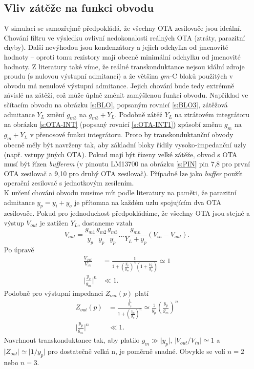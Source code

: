 \subsection{Vliv zátěže na funkci obvodu}
\noindent V simulaci se samozřejmě předpokládá, že všechny OTA zesilovače jsou ideální. Chování filtru ve výsledku ovlivní nedokonalosti reálných OTA (ztráty, parazitní chyby). Další nevýhodou jsou kondenzátory a jejich odchylka od jmenovité hodnoty -- oproti tomu rezistory mají obecně minimální odchylku od jmenovité hodnoty. Z literatury \cite{18} také víme, že reálné transkonduktance nejsou idální zdroje proudu (s nulovou výstupní admitancí) a že většina $gm$-C bloků použitých v obvodu má nenulové výstupní admitance. Jejich chování bude tedy extrémně závislé na zátěži, což může úplně změnit zamýšlenou funkci obvodu. Například ve sčítacím obvodu na obrázku \ref{s:BLO}, popsaným rovnicí \ref{s:BLO3}, zátěžová admitance $Y_L$ změní $g_{m3}$ na $g_{m3} + Y_L$. Podobně zátěž $Y_L$ na ztrátovém integrátoru na obrázku \ref{s:OTA-INT} (popsaný rovnicí \ref{s:OTA-INT1}) způsobí změnu $g_m$ na $g_m + Y_L$ v přenosové funkci integrátoru. Proto by transkonduktanční obvody obecně měly být navrženy tak, aby základní bloky řídily vysoko-impedanční uzly (např. vstupy jiných OTA). Pokud mají být řízeny velké zátěže, obvod s OTA musí být řízen \textit{bufferem} (v pinoutu LM13700 na obrázku \ref{s:PIN} pin 7,8 pro první OTA zesilovač a 9,10 pro druhý OTA zesilovač). Případně lze jako \textit{buffer} použít operační zesilovač s jednotkovým zesílením.\\
\noindent K určení chování obvodu musíme mít podle literatury \cite{18} na paměti, že parazitní admitance $y_p = y_i + y_o$ je přítomna na každém uzlu spojujícím dva OTA zesilovače. Pokud pro jednoduchost předpokládáme, že všechny OTA jsou stejné a výstup $V_{out}$ je zatížen $Y_L$, dostaneme vztah
\begin{equation}
V_{out} = \frac{g_{m1}}{y_p}\frac{g_{m2}}{y_p}\frac{g_{m3}}{y_p} \ldots \frac{g_{mn}}{Y_L + y_p}(V_{in} - V_{out}).
\end{equation}
\noindent Po úpravě
\begin{align}
\frac{V_{out}}{V_{in}} &= \frac{1}{1 + (\frac{y_p}{g_m})^n(1 + \frac{Y_L}{y_p})} \simeq 1 \\
\lvert \frac{y_p}{g_m} \rvert ^n &\ll 1.
\end{align}
\noindent Podobně pro výstupní impedanci $Z_{out}(p)$ platí
\begin{align}
Z_{out}(p) &= \frac{\frac{1}{y_p}}{1 + (\frac{g_m}{y_p})^n} \simeq \frac{1}{y_p}(\frac{y_p}{g_m})^n \\
\lvert \frac{y_p}{g_m} \rvert ^n &\ll 1.
\end{align}
\noindent Navrhnout transkonduktance tak, aby platilo $g_m \gg \lvert y_p \rvert$, $\lvert V_{out}/V_{in} \rvert  \simeq 1$ a $\lvert Z_{out} \rvert \simeq \lvert 1/y_p \rvert$ pro dostatečně velká n, je poměrně snadné. Obvykle se volí $n = 2$ nebo $n = 3$.
